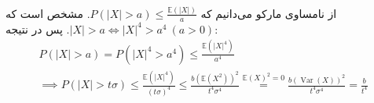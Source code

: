 \\
از نامساوی مارکو می‌دانیم که
$P(|X| > a) \le \frac{\mathbb{E}(|X|)}{a}$.
مشخص است که
$|X| > a \iff |X|^4 > a^4 ~ (a > 0)$.
پس در نتیجه:
\begin{gather*}
    P(|X| > a) = P(|X|^4 > a^4) \le \frac{\mathbb{E}(|X|^4)}{a^4}\\
    \implies P(|X| > t \sigma) \le \frac{\mathbb{E}(|X|^4)}{(t \sigma)^4} \le \frac{b(\mathbb{E}(X^2))^2}{t^4 \sigma^4}
    \stackrel{\mathbb{E}(X)^2 = 0}{=} \frac{b(\operatorname{Var}(X))^2}{t^4 \sigma^4} = \frac{b}{t^4}
\end{gather*}
